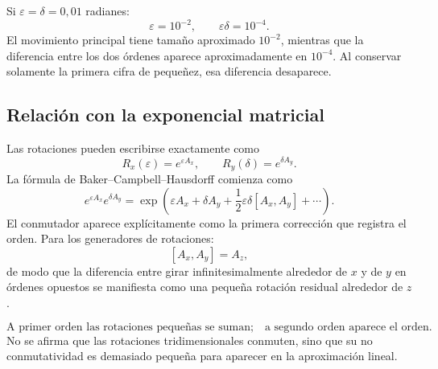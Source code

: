 Si \(\varepsilon=\delta=0{,}01\) radianes:
\[
\varepsilon=10^{-2},
\qquad
\varepsilon\delta=10^{-4}.
\]
El movimiento principal tiene tamaño aproximado \(10^{-2}\), mientras que la diferencia entre
los dos órdenes aparece aproximadamente en \(10^{-4}\). Al conservar solamente la primera
cifra de pequeñez, esa diferencia desaparece.

\subsection{Relación con la exponencial matricial}

Las rotaciones pueden escribirse exactamente como
\[
  R_x(\varepsilon)=e^{\varepsilon A_x},
  \qquad
  R_y(\delta)=e^{\delta A_y}.
\]
La fórmula de Baker--Campbell--Hausdorff comienza como
\[
e^{\varepsilon A_x}e^{\delta A_y}
=
\exp\left(
\varepsilon A_x+\delta A_y
+\frac12\varepsilon\delta[A_x,A_y]+\cdots
\right).
\]
El conmutador aparece explícitamente como la primera corrección que registra el orden.
Para los generadores de rotaciones:
\[
  [A_x,A_y]=A_z,
\]
de modo que la diferencia entre girar infinitesimalmente alrededor de \(x\) y de \(y\) en
órdenes opuestos se manifiesta como una pequeña rotación residual alrededor de \(z\).

\begin{atencion}
\[
\boxed{
\text{A primer orden las rotaciones pequeñas se suman;}
\quad
\text{a segundo orden aparece el orden.}
}
\]
No se afirma que las rotaciones tridimensionales conmuten, sino que su no conmutatividad es
demasiado pequeña para aparecer en la aproximación lineal.
\end{atencion}


